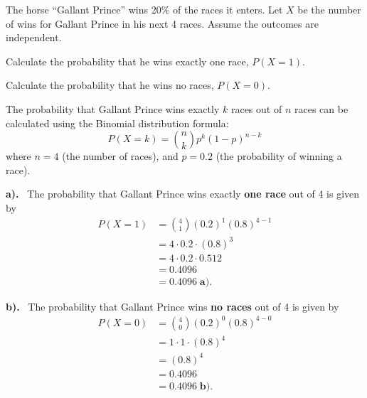 \documentclass[a4paper, 10pt]{article}
\begin{document}
\pagebreak

\begin{problem}
The horse ``Gallant Prince'' wins 20\% of the races it enters.
Let \( X \) be the number of wins for Gallant Prince in his next 4 races.
Assume the outcomes are independent.
\begin{subproblems}
    \item Calculate the probability that he wins exactly one race, \( P(X = 1) \).
    \item Calculate the probability that he wins no races, \( P(X = 0) \).
\end{subproblems}
\end{problem}

\begin{solution}
The probability that Gallant Prince wins exactly \( k \) races out of \( n \) races
can be calculated using the Binomial distribution formula:
\[
    P(X = k) = \binom{n}{k} p^k (1-p)^{n-k}
\]
where \( n = 4 \) (the number of races), and \( p = 0.2 \) (the probability of winning a race).

\par\noindent\textbf{a).} \, The probability that Gallant Prince wins exactly \textbf{one race} out of 4 is given by
\begin{align*}
    P(X = 1) &= \binom{4}{1} (0.2)^1 (0.8)^{4-1} \\
    &= 4 \cdot 0.2 \cdot (0.8)^3 \\
    &= 4 \cdot 0.2 \cdot 0.512 \\
    &= 0.4096 \\
    &= \boxed{0.4096} \; \textbf{a).}
\end{align*}

\par\noindent\textbf{b).} \, The probability that Gallant Prince wins \textbf{no races} out of 4 is given by
\begin{align*}
    P(X = 0) &= \binom{4}{0} (0.2)^0 (0.8)^{4-0} \\
    &= 1 \cdot 1 \cdot (0.8)^4 \\
    &= (0.8)^4 \\
    &= 0.4096 \\
    &= \boxed{0.4096} \; \textbf{b).}
\end{align*}

\end{solution}
\end{document}
